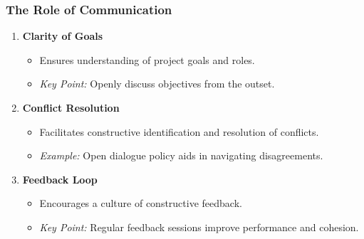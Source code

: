 \documentclass{beamer}
\begin{document}
\begin{frame}[fragile]
    \frametitle{The Role of Communication}
    \begin{enumerate}
        \item \textbf{Clarity of Goals}
            \begin{itemize}
                \item Ensures understanding of project goals and roles.
                \item \textit{Key Point:} Openly discuss objectives from the outset.
            \end{itemize}

        \item \textbf{Conflict Resolution}
            \begin{itemize}
                \item Facilitates constructive identification and resolution of conflicts.
                \item \textit{Example:} Open dialogue policy aids in navigating disagreements.
            \end{itemize}

        \item \textbf{Feedback Loop}
            \begin{itemize}
                \item Encourages a culture of constructive feedback.
                \item \textit{Key Point:} Regular feedback sessions improve performance and cohesion.
            \end{itemize}
    \end{enumerate}
\end{frame}
\end{document}
